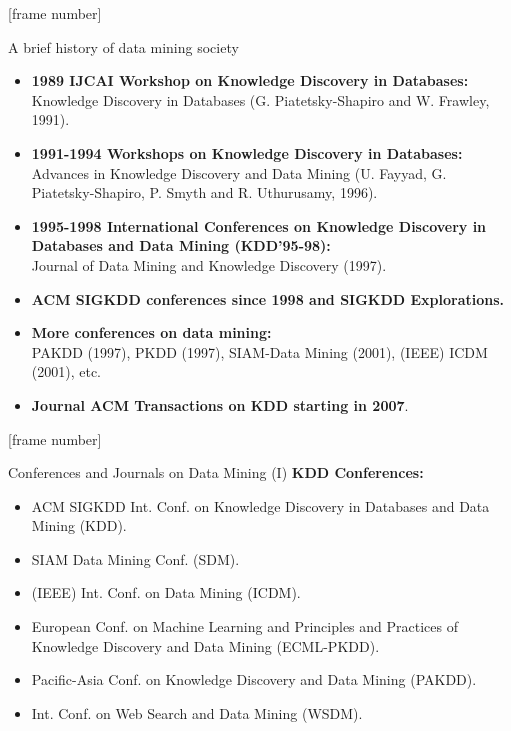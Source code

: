 \documentclass[aspectratio=169,t]{beamer}
\begin{document}
 {
    [frame number]
    \begin{frame}{A brief history of data mining society}
        \begin{itemize}
            \item \textbf{1989 IJCAI Workshop on Knowledge Discovery in Databases:}\\
                  Knowledge Discovery in Databases (G. Piatetsky-Shapiro and W. Frawley, 1991).
            \item \textbf{1991-1994 Workshops on Knowledge Discovery in Databases:}\\
                  Advances in Knowledge Discovery and Data Mining (U. Fayyad, G. Piatetsky-Shapiro, P. Smyth and R. Uthurusamy, 1996).
            \item \textbf{1995-1998 International Conferences on Knowledge Discovery in Databases and Data Mining (KDD’95-98):}\\
                  Journal of Data Mining and Knowledge Discovery (1997).
            \item \textbf{ACM SIGKDD conferences since 1998 and SIGKDD Explorations.}\\
            \item \textbf{More conferences on data mining:}\\
                  PAKDD (1997), PKDD (1997), SIAM-Data Mining (2001), (IEEE) ICDM (2001), etc.
            \item \textbf{Journal ACM Transactions on KDD starting in 2007}.
        \end{itemize}
    \end{frame}
  }

  {
    [frame number]
    \begin{frame}{Conferences and Journals on Data Mining (I)}
    \textbf{KDD Conferences:}
        \begin{itemize}
            \item ACM SIGKDD Int. Conf. on Knowledge Discovery in Databases and Data Mining (KDD).
            \item SIAM Data Mining Conf. (SDM).
            \item (IEEE) Int. Conf. on Data Mining (ICDM).
            \item European Conf. on Machine Learning and Principles and Practices of Knowledge Discovery and Data Mining (ECML-PKDD).
            \item Pacific-Asia Conf. on Knowledge Discovery and Data Mining (PAKDD).
            \item Int. Conf. on Web Search and Data Mining (WSDM).
        \end{itemize}
    \end{frame}
  }
\end{document}
